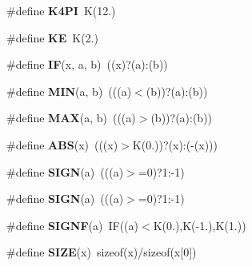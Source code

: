 \begin{DoxyCompactItemize}
\item 
\hypertarget{group__nfftutil_ga2bd86680e3e2809d04bd4968abecae04}{\#define {\bfseries K4\-P\-I}~K(12.)}\label{group__nfftutil_ga2bd86680e3e2809d04bd4968abecae04}

\item 
\hypertarget{group__nfftutil_gad6cbab9b816acb64dddbf8bcb3098ef4}{\#define {\bfseries K\-E}~K(2.)}\label{group__nfftutil_gad6cbab9b816acb64dddbf8bcb3098ef4}

\item 
\hypertarget{group__nfftutil_ga2b4fae951f148354ef77880deaa4166a}{\#define {\bfseries I\-F}(x, a, b)~((x)?(a)\-:(b))}\label{group__nfftutil_ga2b4fae951f148354ef77880deaa4166a}

\item 
\hypertarget{group__nfftutil_ga3acffbd305ee72dcd4593c0d8af64a4f}{\#define {\bfseries M\-I\-N}(a, b)~(((a)$<$(b))?(a)\-:(b))}\label{group__nfftutil_ga3acffbd305ee72dcd4593c0d8af64a4f}

\item 
\hypertarget{group__nfftutil_gafa99ec4acc4ecb2dc3c2d05da15d0e3f}{\#define {\bfseries M\-A\-X}(a, b)~(((a)$>$(b))?(a)\-:(b))}\label{group__nfftutil_gafa99ec4acc4ecb2dc3c2d05da15d0e3f}

\item 
\hypertarget{group__nfftutil_ga996f7be338ccb40d1a2a5abc1ad61759}{\#define {\bfseries A\-B\-S}(x)~(((x)$>$K(0.))?(x)\-:(-\/(x)))}\label{group__nfftutil_ga996f7be338ccb40d1a2a5abc1ad61759}

\item 
\hypertarget{group__nfftutil_ga8c4a9e5e4622948245de4ec0b5d38329}{\#define {\bfseries S\-I\-G\-N}(a)~(((a)$>$=0)?1\-:-\/1)}\label{group__nfftutil_ga8c4a9e5e4622948245de4ec0b5d38329}

\item 
\hypertarget{group__nfftutil_ga8c4a9e5e4622948245de4ec0b5d38329}{\#define {\bfseries S\-I\-G\-N}(a)~(((a)$>$=0)?1\-:-\/1)}\label{group__nfftutil_ga8c4a9e5e4622948245de4ec0b5d38329}

\item 
\hypertarget{group__nfftutil_ga2cc65eb73401bb3d6036b21f5329c0b7}{\#define {\bfseries S\-I\-G\-N\-F}(a)~I\-F((a)$<$K(0.),K(-\/1.),K(1.))}\label{group__nfftutil_ga2cc65eb73401bb3d6036b21f5329c0b7}

\item 
\hypertarget{group__nfftutil_gafd2537d19a3cb6556b0f727580ec6ee7}{\#define {\bfseries S\-I\-Z\-E}(x)~sizeof(x)/sizeof(x\mbox{[}0\mbox{]})}\label{group__nfftutil_gafd2537d19a3cb6556b0f727580ec6ee7}


\end{DoxyCompactItemize}
